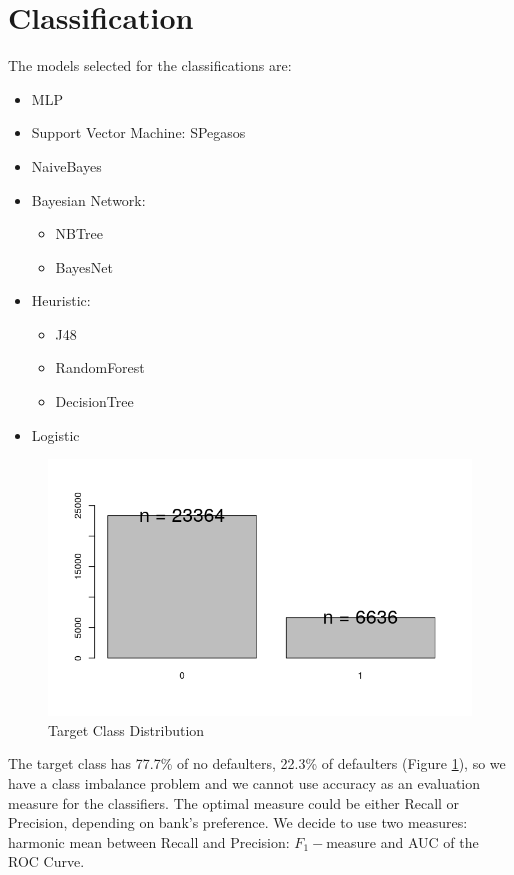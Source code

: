 \documentclass[fleqn,10pt]{SelfArx} %
\begin{document}
	\section{Classification}
	The models selected for the classifications are: 
	\begin{itemize}[noitemsep]
		\item MLP
		\item Support Vector Machine: SPegasos
		\item NaiveBayes
		
		\item Bayesian Network:
		\begin{itemize}[noitemsep]
				\item NBTree
				\item BayesNet
		\end{itemize}
		
		\item  Heuristic:
		\begin{itemize}[noitemsep]
			 \item J48
			 \item RandomForest
			 \item DecisionTree
		\end{itemize}
		
		\item Logistic
		
		
	\end{itemize}

	\begin{figure}[h]
	\includegraphics[width=\linewidth]{class.png}
	\caption{Target Class Distribution}
	\label{fig:class}
	\end{figure}

The target class has 77.7\% of no defaulters, 22.3\% of defaulters (Figure \ref{fig:class}), so we have a class imbalance problem and we cannot use accuracy as an evaluation measure for the classifiers.
The optimal measure could be either Recall or Precision, depending on bank's preference.
We decide to use two measures: harmonic mean between Recall and Precision: $F_1-$measure and AUC of the ROC Curve.
\end{document}
